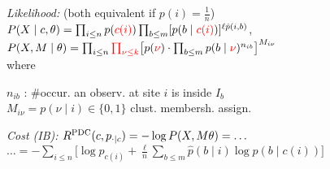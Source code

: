 \emph{Likelihood:}\enspace
(both equivalent if $p(i)=\frac1n$)\\
\enspace $P(X\mid c,\theta) = \prod_{i\leq n} p(\textcolor{red}{c(i)}) \prod_{b\leq m} [p(b\mid \textcolor{red}{c(i)})]^{\ell \hat p(i,b)}$,\\
\enspace $P(X,M\mid \theta) = \prod_{i\leq n} \textcolor{red}{\prod_{\nu\leq k}} \big[ p(\textcolor{red}{\nu}) \cdot \prod_{b\leq m} p(b\mid\textcolor{red}{\nu})^{n_{ib}} \big]^{M_{i\nu}}$
\\
where\enskip
\begin{minipage}[t]{\linewidth-\widthof{where\enskip}}
    $n_{ib}$ : \#occur. an observ. at site $i$ is inside $I_b$ \\
    $M_{i\nu} = p(\nu\mid i) \in \{0,1\}$ \enskip clust. membersh. assign.
\end{minipage}

\emph{Cost (IB):}\enspace
$R^\mathrm{PDC}(c, p_{\cdot\mid c}) = -\log P(X,M\theta) = \ldots$
\hfill $\ldots = -\sum_{i\leq n} \big[ \log p_{c(i)} + \frac{\ell}{n} \sum_{b\leq m} \hat p(b\mid i) \log p(b\mid c(i)) \big]$


